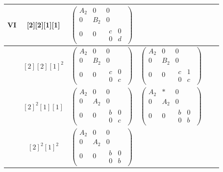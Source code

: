 \documentclass[11pt,a4paper]{article}
\theoremstyle{plain}
\theoremstyle{definition}
\theoremstyle{remark}
\begin{document}
\begin{center}
\begin{tabular}{|c|c|cccc|}
VI & [2][2][1][1] &
$\begin{pmatrix}
A_2 & 0 & 0 \\
0   & B_2 & 0 \\
0   & 0   & \begin{matrix} c & 0 \\ 0 & d \end{matrix}
\end{pmatrix}$ &&
 & \\ \hline
 &  $[2][2][1]^2$&
$\begin{pmatrix}
A_2 & 0 & 0 \\
0   & B_2 & 0 \\
0   & 0   & \begin{matrix} c & 0 \\ 0 & c \end{matrix}
\end{pmatrix}$ &
$\begin{pmatrix}
A_2 & 0 & 0 \\
0   & B_2 & 0 \\
0   & 0   & \begin{matrix} c & 1 \\ 0 & c \end{matrix}
\end{pmatrix}$ & &\\ \hline
 &  $[2]^2[1][1]$&
$\begin{pmatrix}
A_2 & 0 & 0 \\
0   & A_2 & 0 \\
0   & 0   & \begin{matrix} b & 0 \\ 0 & c \end{matrix}
\end{pmatrix}$ &
$\begin{pmatrix}
A_2 & * & 0 \\
0   & A_2 & 0 \\
0   & 0   & \begin{matrix} b & 0 \\ 0 & b \end{matrix}
\end{pmatrix}$ && \\ \hline
 &  $[2]^2[1]^2$&
$\begin{pmatrix}
A_2 & 0 & 0 \\
0   & A_2 & 0 \\
0   & 0   & \begin{matrix} b & 0 \\ 0 & b\end{matrix}
\end{pmatrix}$ &

\end{tabular}
\end{center}
\end{document}
